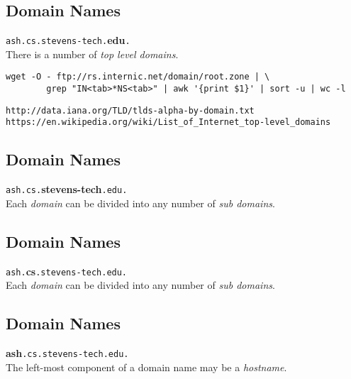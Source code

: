 \documentclass[xga]{xdvislides}
\begin{document}
\subsection{Domain Names}
\vspace{.5in}
\begin{center}
	\Huge
	\verb+ash.cs.stevens-tech.+{\bf edu}\verb+.+ \\
	\vspace{.5in}
	There is a number of {\em top level domains}. \\
	\vspace{.5in}
	\Normalsize
	\begin{verbatim}
wget -O - ftp://rs.internic.net/domain/root.zone | \
        grep "IN<tab>*NS<tab>" | awk '{print $1}' | sort -u | wc -l
\end{verbatim}
	\vspace{.25in}
	\verb+http://data.iana.org/TLD/tlds-alpha-by-domain.txt+ \\
	\verb+https://en.wikipedia.org/wiki/List_of_Internet_top-level_domains+
\end{center}
\Normalsize


\subsection{Domain Names}
\vspace{.5in}
\begin{center}
	\Huge
	\verb+ash.cs.+{\bf stevens-tech}\verb+.edu.+ \\
	\vspace{.5in}
	Each {\em domain} can be divided into any number of {\em sub domains}.
\end{center}
\Normalsize

\subsection{Domain Names}
\vspace{.5in}
\begin{center}
	\Huge
	\verb+ash.+{\bf cs}\verb+.stevens-tech.edu.+ \\
	\vspace{.5in}
	Each {\em domain} can be divided into any number of {\em sub domains}.
\end{center}
\Normalsize

\subsection{Domain Names}
\vspace{.5in}
\begin{center}
	\Huge
	{\bf ash}\verb+.cs.stevens-tech.edu.+ \\
	\vspace{.5in}
	The left-most component of a domain name may be a {\em hostname}.
\end{center}
\Normalsize
\end{document}
